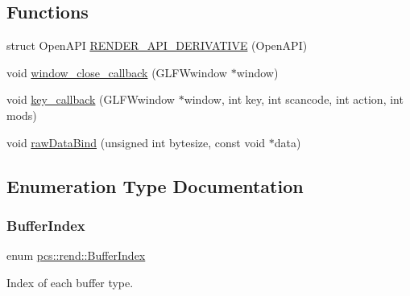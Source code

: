 \subsection*{Functions}
\begin{DoxyCompactItemize}
\item 
struct Open\+A\+PI \hyperlink{namespacepcs_1_1rend_a47b6c0b1a163b77ece37e062069e9a53}{R\+E\+N\+D\+E\+R\+\_\+\+A\+P\+I\+\_\+\+D\+E\+R\+I\+V\+A\+T\+I\+VE} (Open\+A\+PI)
\item 
void \hyperlink{namespacepcs_1_1rend_a1503c4309f7b12b21e81ea63bd94d2aa}{window\+\_\+close\+\_\+callback} (G\+L\+F\+Wwindow $\ast$window)
\item 
void \hyperlink{namespacepcs_1_1rend_a8e7a766672350b75533bef4c5191ae4d}{key\+\_\+callback} (G\+L\+F\+Wwindow $\ast$window, int key, int scancode, int action, int mods)
\item 
void \hyperlink{namespacepcs_1_1rend_ac79ddac7e283a8b63b72499a84603863}{raw\+Data\+Bind} (unsigned int bytesize, const void $\ast$data)
\end{DoxyCompactItemize}


\subsection{Enumeration Type Documentation}
\mbox{\label{namespacepcs_1_1rend_a731e43a479c7b7b61dd23586494ee61b}} 
\subsubsection{\texorpdfstring{Buffer\+Index}{BufferIndex}}
{\footnotesize\ttfamily enum \hyperlink{namespacepcs_1_1rend_a731e43a479c7b7b61dd23586494ee61b}{pcs\+::rend\+::\+Buffer\+Index}\hspace{0.3cm}{\ttfamily [strong]}}



Index of each buffer type. 

